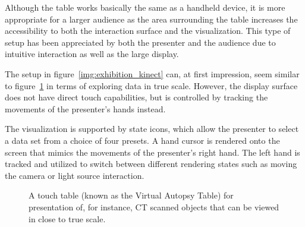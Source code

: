 \documentclass[review,journal]{vgtc}         %
\begin{document}
Although the table works basically the same as a handheld device, it is more appropriate for a larger audience as the area surrounding the table increases the accessibility to both the interaction surface and the visualization.
This type of setup has been appreciated by both the presenter and the audience due to intuitive interaction as well as the large display.


The setup in figure~\ref{img:exhibition_kinect} can, at first impression, seem similar to figure~\ref{img:exhibition_table} in terms of exploring data in true scale.
However, the display surface does not have direct touch capabilities, but is controlled by tracking the movements of the presenter's hands instead.

The visualization is supported by state icons, which allow the presenter to select a data set from a choice of four presets.
A hand cursor is rendered onto the screen that mimics the movements of the presenter's right hand.
The left hand is tracked and utilized to switch between different rendering states such as moving the camera or light source interaction.

\begin{figure}[t]
	\centering
	\caption{A touch table (known as the Virtual Autopsy Table) for presentation of, for instance, CT scanned objects that can be viewed in close to true scale.}
	\label{img:exhibition_table}
\end{figure}
\end{document}
